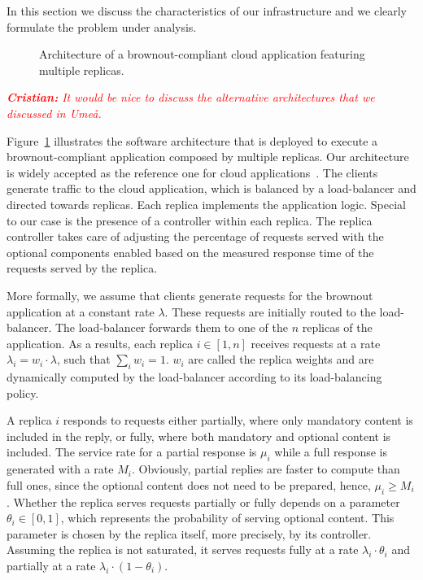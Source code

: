 In this section we discuss the characteristics of our infrastructure
and we clearly formulate the problem under analysis.

\begin{figure}[t]
  \centering 
   
  \caption{Architecture of a brownout-compliant cloud application
    featuring multiple replicas.}
  \label{fig:architecture}
\end{figure}

\textcolor{red}{\textit{\textbf{Cristian:} It would be nice to discuss
    the alternative architectures that we discussed in Umeå.}}

Figure~\ref{fig:architecture} illustrates the software architecture
that is deployed to execute a brownout-compliant application composed
by multiple replicas. Our architecture is widely accepted as the
reference one for cloud applications~\citep{Barroso09}. The clients
generate traffic to the cloud application, which is balanced by a
load-balancer and directed towards replicas. Each replica implements
the application logic. Special to our case is the presence of a
controller within each replica. The replica controller takes care of
adjusting the percentage of requests served with the optional
components enabled based on the measured response time of the requests
served by the replica.

More formally, we assume that clients generate requests for the
brownout application at a constant rate $\lambda$. These requests are
initially routed to the load-balancer. The load-balancer forwards them
to one of the $n$ replicas of the application. As a results, each
replica $i \in [1,n]$ receives requests at a rate $\lambda_i = w_i
\cdot \lambda$, such that $\sum_{i} w_i = 1$. $w_i$ are called the
replica weights and are dynamically computed by the load-balancer
according to its load-balancing policy.

A replica $i$ responds to requests either partially, where only
mandatory content is included in the reply, or fully, where both
mandatory and optional content is included. The service rate for a
partial response is $\mu_i$ while a full response is generated with a
rate $M_i$. Obviously, partial replies are faster to compute than full
ones, since the optional content does not need to be prepared, hence,
$\mu_i \geq M_i$. Whether the replica serves requests partially or
fully depends on a parameter $\theta_i \in [0, 1]$, which represents
the probability of serving optional content. This parameter is chosen
by the replica itself, more precisely, by its controller. Assuming the
replica is not saturated, it serves requests fully at a rate
$\lambda_i \cdot \theta_i$ and partially at a rate $\lambda_i \cdot
(1-\theta_i)$. 


